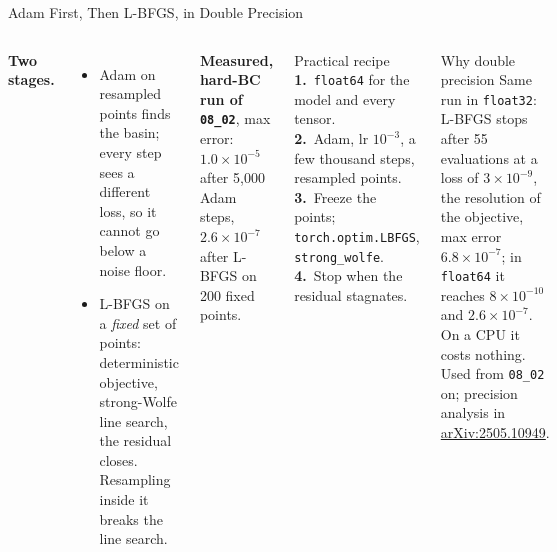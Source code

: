 \documentclass[aspectratio=169,11pt]{beamer}
\newcommand{\emphc}[1]{\textcolor{harvardcrimson}{#1}}
\begin{document}
\begin{frame}{Adam First, Then L-BFGS, in Double Precision}
\small
\begin{columns}[T]
\textbf{Two stages.}
\begin{itemize}\itemsep1pt
    \item \emphc{Adam} on resampled points finds the basin; every step sees a different loss, so it cannot go below a noise floor.
    \item \emphc{L-BFGS} on a \emph{fixed} set of points: deterministic objective, strong-Wolfe line search, the residual closes. Resampling inside it breaks the line search.
\end{itemize}
\textbf{Measured, hard-BC run of \texttt{08\_02}}, max error: $1.0\times10^{-5}$ after 5{,}000 Adam steps, $2.6\times10^{-7}$ after L-BFGS on 200 fixed points.

\begin{block}{Practical recipe}
\footnotesize
\textbf{1.}~\texttt{float64} for the model and every tensor.\\
\textbf{2.}~Adam, lr $10^{-3}$, a few thousand steps, resampled points.\\
\textbf{3.}~Freeze the points; \texttt{torch.optim.LBFGS}, \texttt{strong\_wolfe}.\\
\textbf{4.}~Stop when the residual stagnates.
\end{block}
\begin{alertblock}{Why double precision}
\footnotesize
Same run in \texttt{float32}: L-BFGS stops after 55 evaluations at a loss of $3\times10^{-9}$, the resolution of the objective, max error $6.8\times10^{-7}$; in \texttt{float64} it reaches $8\times10^{-10}$ and $2.6\times10^{-7}$. On a CPU it costs nothing. Used from \texttt{08\_02} on; precision analysis in \href{https://arxiv.org/abs/2505.10949}{arXiv:2505.10949}.
\end{alertblock}
\end{columns}
\end{frame}
\end{document}
